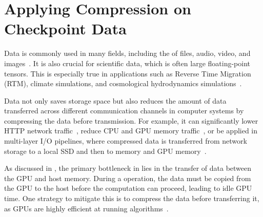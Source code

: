 \documentclass[Ingles]{ic-tese-v3}
\begin{document}
\chapter{Applying Compression on Checkpoint Data}
\label{ch:compress}

Data \compression is commonly used in many fields, including the \compression of files, audio, video, and images~\cite{fz}. It is also crucial for scientific data, which is often large floating-point tensors. This is especially true in applications such as Reverse Time Migration (RTM), climate simulations, and cosmological hydrodynamics simulations~\cite{fz, liu2022, di2025}.

Data \compression not only saves storage space but also reduces the amount of data transferred across different communication channels in computer systems by compressing the data before transmission. For example, it can significantly lower HTTP network traffic~\cite{mogul1997}, reduce CPU and GPU memory traffic~\cite{shen2022,shen2023}, or be applied in multi-layer I/O pipelines, where compressed data is transferred from network storage to a local SSD and then to memory and GPU memory~\cite{maurya2023}.


As discussed in , the primary bottleneck in \awave lies in the transfer of \checkpointing data between the GPU and host memory. During a \save operation, the data must be copied from the GPU to the host before the computation can proceed, leading to idle GPU time. One strategy to mitigate this is to compress the data before transferring it, as GPUs are highly efficient at running \compression algorithms~\cite{dmitriev2022}.
\end{document}
